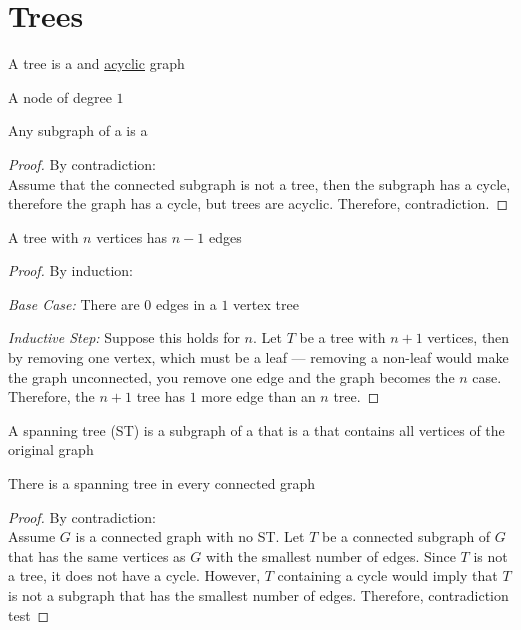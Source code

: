 \section{Trees}
\begin{definition}[tree]
	\label{def:tree}
	A tree is a  and \hyperref[def:cycle]{acyclic} graph
	\begin{definition}[leaf]
		\label{def:leaf}
		A node of degree \(1\) 
	\end{definition}
\end{definition}

\begin{lemma}
	Any  subgraph of a  is a  
\end{lemma}
\begin{proof}
	By contradiction: \\
	Assume that the connected subgraph is not a tree, then the subgraph has a cycle, therefore the graph has a cycle, but trees are acyclic. Therefore, contradiction.
\end{proof}

\begin{lemma}
	A tree with \(n\) vertices has \(n-1\) edges
\end{lemma}
\begin{proof}
	By induction:
	
	\emph{Base Case:} There are \(0\) edges in a \(1\) vertex tree

	\emph{Inductive Step:} Suppose this holds for \(n\).
	Let \(T\) be a tree with \(n+1\) vertices, then by removing one vertex, which must be a leaf — removing a non-leaf would make the graph unconnected, you remove one edge and the graph becomes the \(n\) case.
	Therefore, the \(n+1\) tree has \(1\) more edge than an \(n\) tree.
\end{proof}

\begin{definition}
	\label{def:spanning tree}
	A spanning tree (ST) is a subgraph of a  that is a  that contains all vertices of the original graph
\end{definition}

\begin{lemma}
	There is a spanning tree in every connected graph
\end{lemma}
\begin{proof}
	By contradiction: \\
	Assume \(G\) is a connected graph with no ST.
	Let \(T\) be a connected subgraph of \(G\)  that has the same vertices as \(G\) with the smallest number of edges. Since \(T\) is not a tree, it does not have a cycle. However, \(T\) containing a cycle would imply that \(T\) is not a subgraph that has the smallest number of edges.
	Therefore, contradiction test 
\end{proof}
